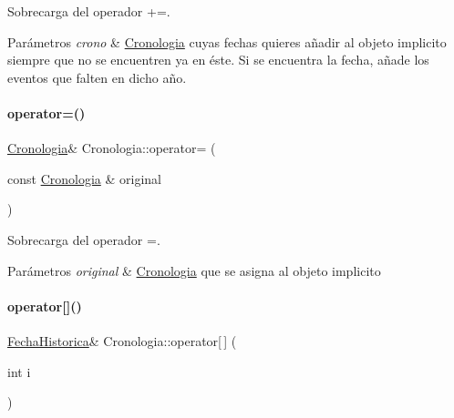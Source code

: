 Sobrecarga del operador +=. 


\begin{DoxyParams}{Parámetros}
{\em crono} & \hyperlink{classCronologia}{Cronologia} cuyas fechas quieres añadir al objeto implicito siempre que no se encuentren ya en éste. Si se encuentra la fecha, añade los eventos que falten en dicho año. \\
\hline
\end{DoxyParams}
\mbox{\label{classCronologia_a28519d10143c6587318536bebab56137}} 
\paragraph{\texorpdfstring{operator=()}{operator=()}}
{\footnotesize\ttfamily \hyperlink{classCronologia}{Cronologia}\& Cronologia\+::operator= (\begin{DoxyParamCaption}\item[{const \hyperlink{classCronologia}{Cronologia} \&}]{original }\end{DoxyParamCaption})}



Sobrecarga del operador =. 


\begin{DoxyParams}{Parámetros}
{\em original} & {\ttfamily \hyperlink{classCronologia}{Cronologia}} que se asigna al objeto implicito \\
\hline
\end{DoxyParams}
\mbox{\label{classCronologia_a61a7c1b52f071330a04f997c85ad208b}} 
\paragraph{\texorpdfstring{operator[]()}{operator[]()}\hspace{0.1cm}{\footnotesize\ttfamily [1/2]}}
{\footnotesize\ttfamily \hyperlink{classFechaHistorica}{Fecha\+Historica}\& Cronologia\+::operator\mbox{[}$\,$\mbox{]} (\begin{DoxyParamCaption}\item[{int}]{i }\end{DoxyParamCaption})}



